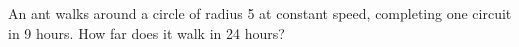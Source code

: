 An ant walks around a circle of radius 5 at constant speed, completing one circuit in 9 hours. How far does it walk in 24 hours?
